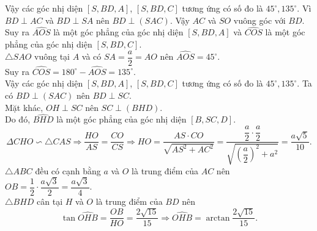 \begin{ex}
{\begin{itemchoice}
			Vậy các góc nhị diện $[S, B D, A]$, $[S, B  D, C]$ tương ứng có số đo là $45^{\circ}, 135^{\circ}$.
			\itemch Vì $B D \perp A C$ và  $B D \perp S A$ nên $B D \perp(S A C)$. Vậy $A C$ và $S O$ vuông góc với $B D$.\\
			Suy ra $\widehat{A O S}$ là một góc phẳng của góc nhị diện $[S, B D, A]$ và $\widehat{C O S}$ là một góc phẳng của góc  nhị diện $[S, B D, C]$.\\
			$\triangle S A O$ vuông tại $A$ và có $S A=\dfrac{a}{2}=A O$ nên $\widehat{A O S}=45^{\circ}$.\\  Suy ra $\widehat{C O S}=180^{\circ}-\widehat{A O S}=135^{\circ}$.\\
			Vậy các góc nhị diện $[S, B D, A]$, $[S, B D, C]$ tương ứng có số đo là  $45^{\circ}, 135^{\circ}$.
			\itemch Ta có $B D \perp(S A C)$ nên $B D \perp S C$.\\ Mặt khác, $O H \perp S C$ nên $S C \perp(B  H D)$.\\
			Do đó,  $\widehat{B H D}$ là một góc phẳng của góc nhị diện $[B, S C, D]$.
			 $$
			\Delta C H O \backsim \triangle C A S \Rightarrow \dfrac{H O}{A S}=\dfrac{C O}{C S} \Rightarrow H O=\dfrac{A S \cdot C O}{\sqrt{A S^2+A  C^2}}=\dfrac{\dfrac{a}{2} \cdot \dfrac{a}{2}}{\sqrt{\left(\dfrac{a}{2}\right)^2+a^2}}=\dfrac{a \sqrt{5}}{10} .
			$$ 
			$\triangle A B C$ đều có cạnh bằng $a$ và $O$ là trung điểm của $A C$ nên $O B=\dfrac{1}{2} \cdot \dfrac{a  \sqrt{3}}{2}=\dfrac{a \sqrt{3}}{4}$.\\
			$\triangle B H D$ cân tại $H$ và $O$ là trung điểm của $B  D$ nên
			$$ 
			\tan \widehat{O H  B}=\dfrac{O B}{H O}=\dfrac{2 \sqrt{15}}{15} \Rightarrow \widehat{O H B}=\arctan \dfrac{2 \sqrt{15}}{15}.
			 $$
		\end{itemchoice}
	} 
\end{ex}

